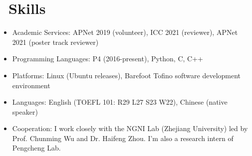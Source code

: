 \documentclass{resume}
\begin{document}
\section{\faCogs\ Skills}
\begin{itemize}[parsep=0.5ex]
  \item Academic Services: APNet 2019 (volunteer), ICC 2021 (reviewer), APNet 2021 (poster track reviewer)
  \item Programming Languages: P4 (2016-present), Python, C, C++
  \item Platforms: Linux (Ubuntu releases), Barefoot Tofino software development environment
  \item Languages: English (TOEFL 101: R29 L27 S23 W22), Chinese (native speaker)
  \item Cooperation: I work closely with the NGNI Lab (Zhejiang University) led by Prof. Chunming Wu and Dr. Haifeng Zhou. I'm also a research intern of Pengcheng Lab.
\end{itemize}



\newpage
\end{document}
